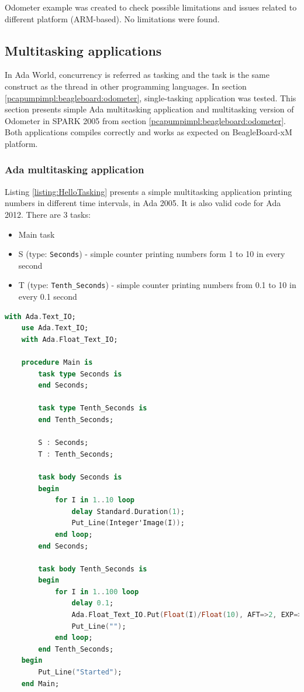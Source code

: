 Odometer example was created to check possible limitations and issues related to different platform (ARM-based). No limitations were found.


\subsection{Multitasking applications}
\label{pcapumpimpl:beagleboard:multitasking}

In Ada World, concurrency is referred as tasking and the task is the same construct as the thread in other programming languages. In section \ref{pcapumpimpl:beagleboard:odometer}, single-tasking application was tested. This section presents simple Ada multitasking application and multitasking version of Odometer in SPARK 2005 from section \ref{pcapumpimpl:beagleboard:odometer}. Both applications compiles correctly and works as expected on BeagleBoard-xM platform.

\subsubsection{Ada multitasking application}

Listing \ref{listing:HelloTasking} presents a simple multitasking application printing numbers in different time intervals, in Ada 2005. It is also valid code for Ada 2012. There are 3 tasks:
\begin{itemize}
    \item Main task
    \item S (type: \lstinline{Seconds}) - simple counter printing numbers form 1 to 10 in every second
    \item T (type: \lstinline{Tenth_Seconds}) - simple counter printing numbers from 0.1 to 10 in every 0.1 second
\end{itemize}

\begin{lstlisting}[language=ada, frame=single, gobble=0, caption={Simple multitask application in Ada}]
	with Ada.Text_IO;
	use Ada.Text_IO;
	with Ada.Float_Text_IO;

	procedure Main is
	    task type Seconds is
	    end Seconds;

	    task type Tenth_Seconds is
	    end Tenth_Seconds;

	    S : Seconds;
	    T : Tenth_Seconds;

	    task body Seconds is
	    begin
	        for I in 1..10 loop
	            delay Standard.Duration(1);
	            Put_Line(Integer'Image(I));
	        end loop;
	    end Seconds;

	    task body Tenth_Seconds is
	    begin
	        for I in 1..100 loop            
	            delay 0.1;            
	            Ada.Float_Text_IO.Put(Float(I)/Float(10), AFT=>2, EXP=>0);
	            Put_Line("");
	        end loop;
	    end Tenth_Seconds;
	begin
	    Put_Line("Started");
	end Main;
\end{lstlisting} 
\label{listing:HelloTasking}

